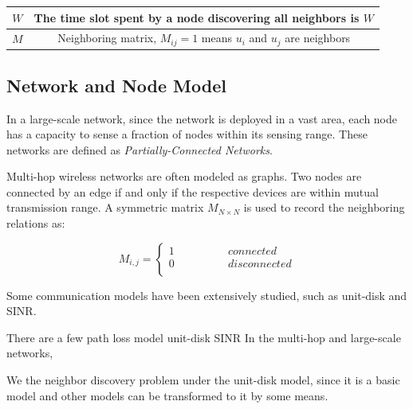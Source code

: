 \begin{table}[!t]
{\begin{tabular}{|c|c|}
$W$ & The time slot spent by a node discovering all neighbors is $W$ \\
\hline
$M$ & Neighboring matrix, $M_{ij}=1$ means $u_i$ and $u_j$ are neighbors \\
\hline
\end{tabular}}
\end{table}


\subsection{Network and Node Model}

 In a large-scale network, 
since the network is deployed in a vast area, each node 
has a capacity to sense a fraction of nodes within its sensing range.
These networks are defined as \emph{Partially-Connected Networks}.

Multi-hop wireless networks are often modeled as graphs. Two nodes are connected by an 
edge if and only if the respective devices are within mutual transmission range. 
A symmetric matrix $M_{N\times N}$ is used to record the neighboring relations as:

$$ M_{i,j}=\left\{
\begin{aligned}
1  & & & & & & {connected}\\
0  & & & & & & {disconnected}\\
\end{aligned}
\right.
$$

Some communication models have been extensively studied,
such as unit-disk and SINR.

There are a few path loss model unit-disk SINR
In the multi-hop and large-scale
networks,  

We the neighbor discovery problem under the unit-disk model, 
since it is a basic model and other models can be transformed to 
it by some means.%



